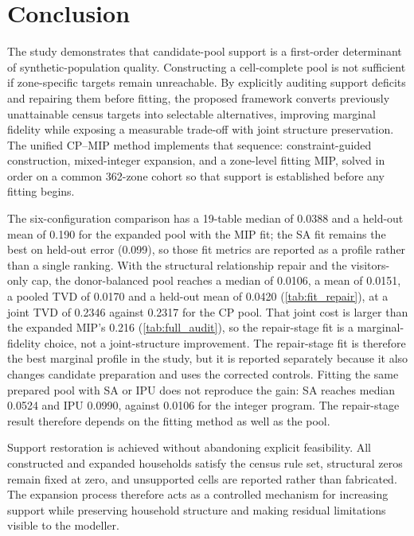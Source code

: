 \documentclass[review]{elsarticle}
\begin{document}
\section{Conclusion}




The study demonstrates that candidate-pool support is a first-order determinant of synthetic-population quality. Constructing a cell-complete pool is not sufficient if zone-specific targets remain unreachable. By explicitly auditing support deficits and repairing them before fitting, the proposed framework converts previously unattainable census targets into selectable alternatives, improving marginal fidelity while exposing a measurable trade-off with joint structure preservation. The unified CP--MIP method implements that sequence: constraint-guided construction, mixed-integer expansion, and a zone-level fitting MIP, solved in order on a common 362-zone cohort so that support is established before any fitting begins.

The six-configuration comparison has a 19-table median of 0.0388 and a
held-out mean of 0.190 for the expanded pool with the MIP fit; the SA fit
remains the best on held-out error (0.099), so those fit metrics are reported
as a profile rather than a single ranking.  With the structural relationship
repair and the visitors-only cap, the donor-balanced pool reaches a median of
0.0106, a mean of 0.0151, a pooled TVD of 0.0170 and a held-out mean of 0.0420
(\cref{tab:fit_repair}), at a joint TVD of 0.2346 against 0.2317 for the CP
pool.  That joint cost is larger than the expanded MIP's 0.216
(\cref{tab:full_audit}), so the repair-stage fit is a marginal-fidelity
choice, not a joint-structure improvement.  The repair-stage fit is therefore
the best marginal profile in the study, but it is reported separately because
it also changes candidate preparation and uses the corrected controls.
Fitting the same prepared pool with SA or IPU does not reproduce the gain: SA
reaches median 0.0524 and IPU 0.0990, against 0.0106 for the integer program.
The repair-stage result therefore depends on the fitting method as well as the
pool.

Support restoration is achieved without abandoning explicit feasibility. All constructed and expanded households satisfy the census rule set, structural zeros remain fixed at zero, and unsupported cells are reported rather than fabricated. The expansion process therefore acts as a controlled mechanism for increasing support while preserving household structure and making residual limitations visible to the modeller.
\end{document}
